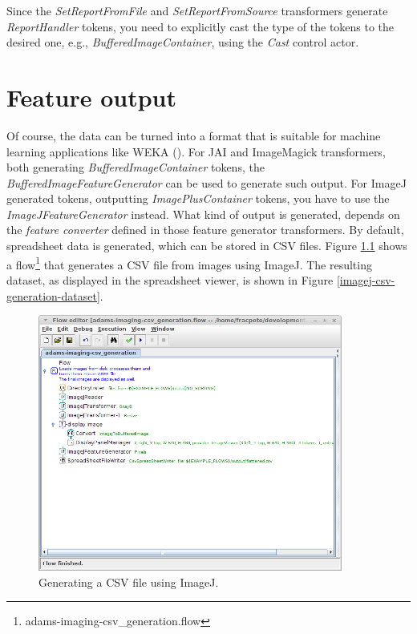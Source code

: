 \documentclass[a4paper]{book}
\begin{document}
Since the \textit{SetReportFromFile} and \textit{SetReportFromSource}
transformers generate \textit{ReportHandler} tokens, you need to explicitly
cast the type of the tokens to the desired one, e.g.,
\textit{BufferedImageContainer}, using the \textit{Cast} control actor.

\chapter{Feature output}
Of course, the data can be turned into a format that is suitable for machine 
learning applications like WEKA (\cite{weka}). For JAI and ImageMagick 
transformers, both generating \textit{BufferedImageContainer} tokens, the 
\textit{BufferedImageFeatureGenerator} can be used to
generate such output. For ImageJ generated tokens, outputting 
\textit{ImagePlusContainer} tokens, you have to use the 
\textit{ImageJFeatureGenerator} instead. What kind of output is generated,
depends on the \textit{feature converter} defined in those feature generator
transformers. By default, spreadsheet data is generated, which can be stored
in CSV files. Figure \ref{imagej-csv-generation-flow} shows a
flow\footnote{adams-imaging-csv\_generation.flow} that generates a CSV file
from images using ImageJ. The resulting dataset, as displayed in the spreadsheet
viewer, is shown in Figure \ref{imagej-csv-generation-dataset}.

\begin{figure}[htb]
  \centering
  \includegraphics[width=10.0cm]{images/imagej-csv-generation-flow.png}
  \caption{Generating a CSV file using ImageJ.}
  \label{imagej-csv-generation-flow}
\end{figure}
\end{document}
